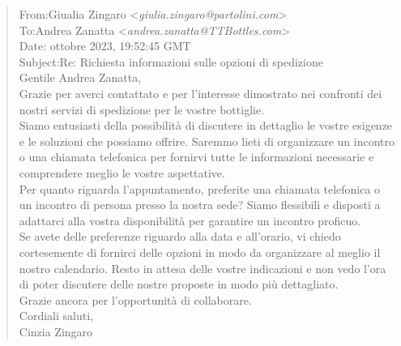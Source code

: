 \footnotesize
\begin{tcolorbox}[colback=gray!20, colframe=gray!50,sharp corners=southwest]
\begin{quote}
From:\qquad Giualia Zingaro <\textit{giulia.zingaro@partolini.com}>\\
To:\qquad Andrea Zanatta <\textit{andrea.zanatta@TTBottles.com}>\\
Date: ottobre 2023, 19:52:45 GMT\\
Subject:\qquad Re: Richiesta informazioni sulle opzioni di spedizione\vspace{14pt}\\
Gentile Andrea Zanatta,\\
Grazie per averci contattato e per l'interesse dimostrato nei confronti dei nostri servizi di spedizione per le vostre bottiglie.\\
Siamo entusiasti della possibilità di discutere in dettaglio le vostre esigenze e le soluzioni che possiamo offrire. Saremmo lieti di organizzare un incontro o una chiamata telefonica per fornirvi tutte le informazioni necessarie e comprendere meglio le vostre aspettative.\\
Per quanto riguarda l'appuntamento, preferite una chiamata telefonica o un incontro di persona presso la nostra sede? Siamo flessibili e disposti a adattarci alla vostra disponibilità per garantire un incontro proficuo.\\
Se avete delle preferenze riguardo alla data e all'orario, vi chiedo cortesemente di fornirci delle opzioni in modo da organizzare al meglio il nostro calendario. Resto in attesa delle vostre indicazioni e non vedo l'ora di poter discutere delle nostre proposte in modo più dettagliato.\\
Grazie ancora per l'opportunità di collaborare.\\
Cordiali saluti,\\
Cinzia Zingaro
\vspace{14pt}\\


\end{quote}
\end{tcolorbox}
